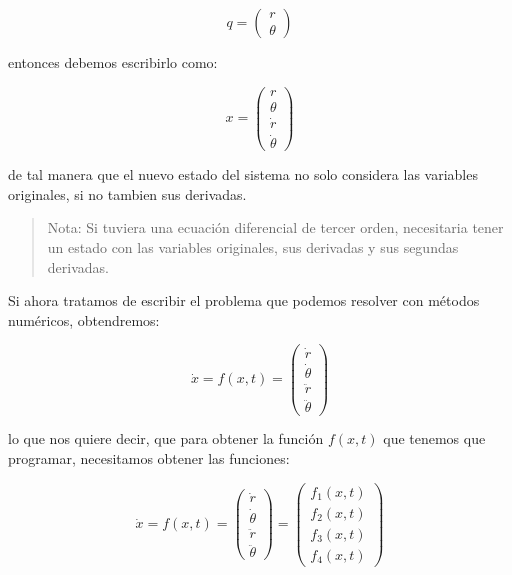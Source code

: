 \documentclass{article}
\begin{document}
    \begin{equation}
q =
\begin{pmatrix}
r \\
\theta
\end{pmatrix}
\end{equation}

    entonces debemos escribirlo como:

    \begin{equation}
x =
\begin{pmatrix}
r \\
\theta \\
\dot{r} \\
\dot{\theta}
\end{pmatrix}
\end{equation}

    de tal manera que el nuevo estado del sistema no solo considera las
variables originales, si no tambien sus derivadas.

\begin{quote}
Nota: Si tuviera una ecuación diferencial de tercer orden, necesitaria
tener un estado con las variables originales, sus derivadas y sus
segundas derivadas.
\end{quote}

    Si ahora tratamos de escribir el problema que podemos resolver con
métodos numéricos, obtendremos:

    \begin{equation}
\dot{x} = f(x, t) =
\begin{pmatrix}
\dot{r} \\
\dot{\theta} \\
\ddot{r} \\
\ddot{\theta}
\end{pmatrix}
\end{equation}

    lo que nos quiere decir, que para obtener la función \(f(x, t)\) que
tenemos que programar, necesitamos obtener las funciones:

    \begin{equation}
\dot{x} = f(x, t) =
\begin{pmatrix}
\dot{r} \\
\dot{\theta} \\
\ddot{r} \\
\ddot{\theta}
\end{pmatrix} =
\begin{pmatrix}
f_1 (x, t) \\
f_2 (x, t) \\
f_3 (x, t) \\
f_4 (x, t)
\end{pmatrix}
\end{equation}
\end{document}
